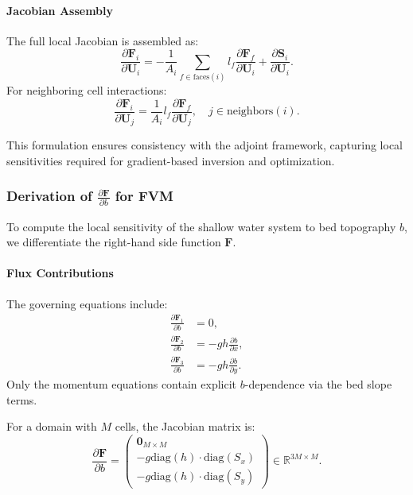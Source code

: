 \paragraph{Jacobian Assembly}
The full local Jacobian is assembled as:
\begin{equation}
\frac{\partial \mathbf{F}_i}{\partial \mathbf{U}_i} = -\frac{1}{A_i} \sum_{f \in \text{faces}(i)} l_f \frac{\partial \mathbf{F}_f}{\partial \mathbf{U}_i} + \frac{\partial \mathbf{S}_i}{\partial \mathbf{U}_i}.
\end{equation}
For neighboring cell interactions:
\begin{equation}
\frac{\partial \mathbf{F}_i}{\partial \mathbf{U}_j} = \frac{1}{A_i} l_f \frac{\partial \mathbf{F}_f}{\partial \mathbf{U}_j}, \quad j \in \text{neighbors}(i).
\end{equation}

This formulation ensures consistency with the adjoint framework, capturing local sensitivities required for gradient-based inversion and optimization.




\subsubsection*{Derivation of $\frac{\partial \mathbf{F}}{\partial b}$ for FVM}
To compute the local sensitivity of the shallow water system to bed topography \( b \), we differentiate the right-hand side function \( \mathbf{F} \).

\paragraph{Flux Contributions}
The governing equations include:
\begin{align}
\frac{\partial \mathbf{F}_1}{\partial b} &= 0, \\[5pt]
\frac{\partial \mathbf{F}_2}{\partial b} &= -gh \frac{\partial b}{\partial x}, \\[5pt]
\frac{\partial \mathbf{F}_3}{\partial b} &= -gh \frac{\partial b}{\partial y}.
\end{align}
Only the momentum equations contain explicit \( b \)-dependence via the bed slope terms.

For a domain with \( M \) cells, the Jacobian matrix is:
\begin{equation}
\frac{\partial \mathbf{F}}{\partial b} =
\begin{pmatrix}
\mathbf{0}_{M \times M} \\[5pt]
- g \text{diag}(h) \cdot \text{diag}(S_x) \\[5pt]
- g \text{diag}(h) \cdot \text{diag}(S_y)
\end{pmatrix} \in \mathbb{R}^{3M \times M}.
\end{equation}


